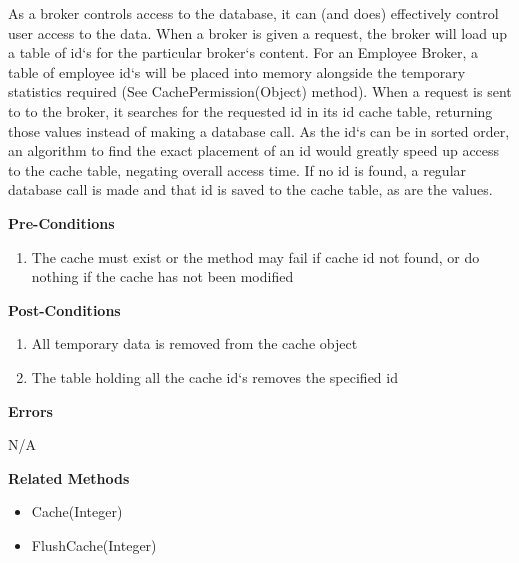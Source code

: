 \documentclass[letterpaper,12pt]{report}
\begin{document}
{\begin{description}
	\par \noindent \hspace*{1cm} As a broker controls access to the database, it can (and does) effectively control user access to the data. When a broker is given a request, the broker will load up a table of id`s for the particular broker`s content. For an Employee Broker, a table of employee id`s will be placed into memory alongside the temporary statistics required (See CachePermission(Object) method). When a request is sent to to the broker, it searches for the requested id in its id cache table, returning those values instead of making a database call. As the id`s can be in sorted order, an algorithm to find the exact placement of an id would greatly speed up access to the cache table, negating overall access time. If no id is found, a regular database call is made and that id is saved to the cache table, as are the values. 
      \item \textbf{Pre-Conditions}
      \begin{enumerate}
       \item The cache must exist or the method may fail if cache id not found, or do nothing if the cache has not been modified
      \end{enumerate}
      \item \textbf{Post-Conditions}
      \begin{enumerate}
       \item All temporary data is removed from the cache object
       \item The table holding all the cache id`s removes the specified id
      \end{enumerate}
      \item[] \textbf{Errors}
	\par \noindent \hspace*{1cm} N/A
      \item \textbf{Related Methods} 
      \begin{itemize}
       \item Cache(Integer)
       \item FlushCache(Integer)
      \end{itemize}
    \end{description}
}
\end{document}
